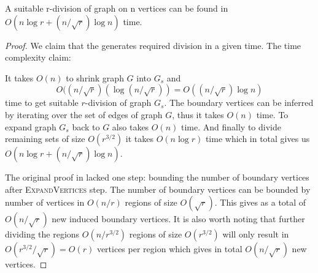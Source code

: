 \begin{theorem} 
A suitable r-division of graph on n vertices can be found in $O(n \log r + (n/\sqrt{r})\log n)$ time.
\end{theorem}

\begin{proof}
    
We claim that the  generates required division in a given time.
The time complexity claim: 

It takes $O(n)$ to shrink graph $G$ into $G_s$ and $$O((n/\sqrt{r})(\log(n/\sqrt{r})) = O((n/\sqrt{r})\log n)$$ time to get suitable $r$-division of graph $G_s$. The boundary vertices can be inferred by iterating over the set of edges of graph $G$, thus it takes $O(n)$ time. To expand graph $G_s$ back to $G$ also takes $O(n)$ time. And finally to divide remaining sets of size $O(r^{3/2})$ it takes $O(n \log r)$ time which in total gives us $O(n \log r + (n/\sqrt{r})\log{n})$.

The original proof in \cite{frederickson} lacked one step: bounding the number of boundary vertices after \textsc{ExpandVertices} step. The number of boundary vertices can be bounded by number of vertices in $O(n / r)$ regions of size $O(\sqrt{r})$. This gives as a total of $O(n/\sqrt{r})$ new induced boundary vertices. It is also worth noting that further dividing the regions $O(n / r^{3/2})$ regions of size $O(r^{3/2})$ will only result in $O(r^{3/2}/\sqrt{r}) = O(r)$ vertices per region which gives in total $O(n/\sqrt{r})$ new vertices.
\end{proof}
